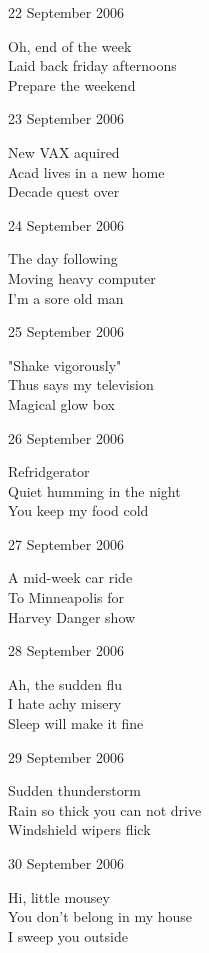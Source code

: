 \documentclass[12pt]{article}
\begin{document}
22 September 2006
      
Oh, end of the week \\
Laid back friday afternoons \\
Prepare the weekend
      
23 September 2006
      
New VAX aquired \\
Acad lives in a new home \\
Decade quest over
      
24 September 2006
      
The day following \\
Moving heavy computer \\
I'm a sore old man


\newpage

25 September 2006

"Shake vigorously" \\
Thus says my television \\
Magical glow box
      
26 September 2006
      
Refridgerator \\
Quiet humming in the night \\
You keep my food cold
      
27 September 2006
      
A mid-week car ride \\
To Minneapolis for \\
Harvey Danger show
      
28 September 2006
      
Ah, the sudden flu \\
I hate achy misery \\
Sleep will make it fine
      
29 September 2006
      
Sudden thunderstorm \\
Rain so thick you can not drive \\
Windshield wipers flick
      
30 September 2006
      
Hi, little mousey \\
You don't belong in my house \\
I sweep you outside

\newpage
\end{document}
